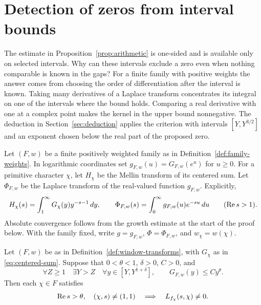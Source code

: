 \section{Detection of zeros from interval bounds}\label{sec:window}

The estimate in Proposition~\ref{prop:arithmetic} is one-sided
and is available only on selected intervals. Why can these intervals exclude a zero even when nothing comparable is known in the
gaps? For a finite family with positive weights the answer comes from choosing the
order of differentiation after the interval is known. Taking many derivatives of a Laplace
transform concentrates its integral on one of the intervals where the bound holds.
Comparing a real derivative with one at a complex point makes
the kernel in the upper bound nonnegative. The deduction in
Section~\ref{sec:deduction} applies the criterion with
intervals \([Y,Y^{3/2}]\) and an exponent chosen below the real part of the
proposed zero.

\begin{definition}\label{def:window-transforms}
Let \((F,w)\) be a finite positively weighted family as in
Definition~\ref{def:family-weights}. In logarithmic coordinates set
\(g_{F,w}(u)=G_{F,w}(e^u)\) for \(u\ge0\).
For a primitive character \(\chi\), let \(H_\chi\) be the Mellin
transform of its centered sum. Let \(\Phi_{F,w}\) be the Laplace
transform of the real-valued function \(g_{F,w}\). Explicitly,
\[
 H_\chi(s)=\int_1^\infty G_\chi(y)y^{-s-1}\,dy,\qquad
 \Phi_{F,w}(s)=\int_0^\infty g_{F,w}(u)e^{-su}\,du
                       \qquad(\operatorname{Re} s>1).
\]
Absolute convergence follows from the growth estimate at the start
of the proof below. With the family fixed, write \(g=g_{F,w}\),
\(\Phi=\Phi_{F,w}\), and \(w_\chi=w(\chi)\).
\end{definition}

\begin{theorem}\label{thm:window}
Let \((F,w)\) be as in Definition~\ref{def:window-transforms},
with \(G_\chi\) as in \eqref{eq:centered-sum}.
Suppose that \(0<\theta<1\), \(\delta>0\), \(C>0\), and
\[
 \forall Z\ge1\quad\exists Y>Z\quad\forall y\in[Y,Y^{1+\delta}],
             \qquad G_{F,w}(y)\le Cy^\theta .
\]
Then each \(\chi\in F\) satisfies
\[
 \operatorname{Re} s>\theta,\quad (\chi,s)\ne(1,1)
         \quad\Longrightarrow\quad L_{f_\chi}(s,\chi)\ne0.
\]
\end{theorem}

